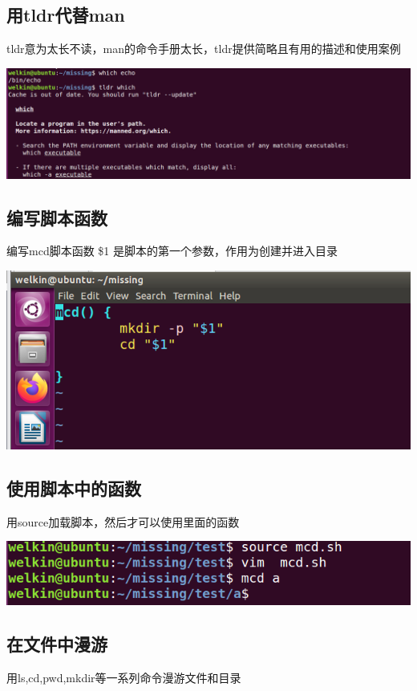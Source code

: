 \documentclass[UTF8,a4paper]{ctexart}
\begin{document}
\begin{sloppypar}
	\subsection{用tldr代替man}
	tldr意为太长不读，man的命令手册太长，tldr提供简略且有用的描述和使用案例
	
	\includegraphics[width = 16cm]{4}
	
	\subsection{编写脚本函数}
	编写mcd脚本函数 \$1 是脚本的第一个参数，作用为创建并进入目录
	
	\includegraphics[width = 16cm]{5}
	
	\subsection{使用脚本中的函数}
	用source加载脚本，然后才可以使用里面的函数
	
	\includegraphics[width = 16cm]{6}
	
	\subsection{在文件中漫游}
	用ls,cd,pwd,mkdir等一系列命令漫游文件和目录
	

\end{sloppypar}
\end{document}

